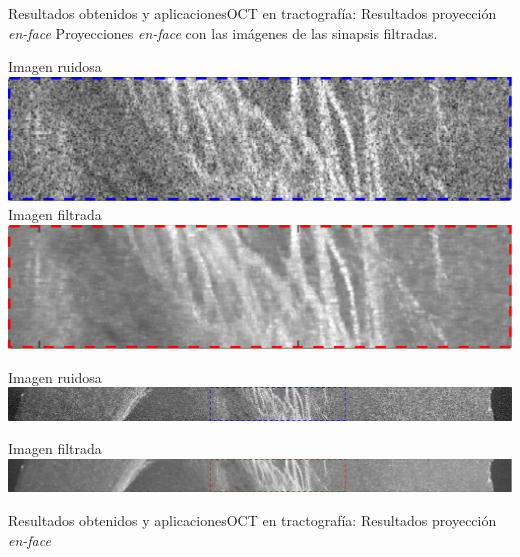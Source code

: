 \documentclass[fleqn,10pt]{beamer}
\begin{document}
\begin{frame}{Resultados obtenidos y aplicaciones}{OCT en tractografía: Resultados proyección \emph{en-face}}
	Proyecciones \emph{en-face} con las imágenes de las sinapsis filtradas.
	
	\begin{multicols}{2}
		\centering
		Imagen ruidosa
		\includegraphics[width=1\linewidth]{AAUgraphics/pt3/Brain/Enface_zoomed_nsy_lines}
		\newpage
		Imagen filtrada
		\includegraphics[width=1\linewidth]{AAUgraphics/pt3/Brain/Enface_zoomed_filt_lines}
	\end{multicols}
	\centering
	Imagen ruidosa
	\includegraphics[width=1\linewidth]{AAUgraphics/pt3/Brain/Enface_nsy_brain_lines}
	
	Imagen filtrada
	\includegraphics[width=1\linewidth]{AAUgraphics/pt3/Brain/Enface_filt_brain_lines}
\end{frame}

\begin{frame}{Resultados obtenidos y aplicaciones}{OCT en tractografía: Resultados proyección \emph{en-face}}
	\vspace*{-0.2cm}
	\begin{center}
	\end{center}
\end{frame}
\end{document}
